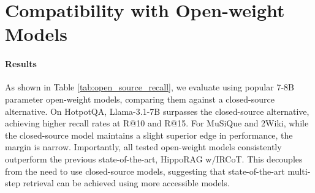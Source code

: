 \section{Compatibility with Open-weight Models}
\label{appendix_sec:open_source_model_experiments}

\paragraph{\gear Results}
As shown in Table \ref{tab:open_source_recall}, we evaluate \gear using popular 7-8B parameter open-weight models, comparing them against a closed-source alternative. On HotpotQA, Llama-3.1-7B surpasses the closed-source alternative, achieving higher recall rates at R@10 and R@15. For MuSiQue and 2Wiki, while the closed-source model maintains a slight superior edge in performance, the margin is narrow. Importantly, all tested open-weight models consistently outperform the previous state-of-the-art, HippoRAG w$/$IRCoT. This decouples \gear from the need to use closed-source models, suggesting that state-of-the-art multi-step retrieval can be achieved using more accessible models.

\begin{table*}[tbhp]
\small
\centering
{}
\caption{Retrieval performance of \gear across different closed-source and open-weight models on MuSiQue, 2Wiki and HotpotQA. Results are reported using Recall@$k$ (R@$k$) metrics for $k \in \left \{5, 10, 15 \right\}$, showing the percentage of questions for which the correct entries are found within the top-$k$ retrieved passages. The included open-weight models are Llama-3.1-8B-Instruct and Qwen-2.5-7B-Instruct, and the closed-source model is GPT-4o mini.}
\label{tab:open_source_recall}
\end{table*}


